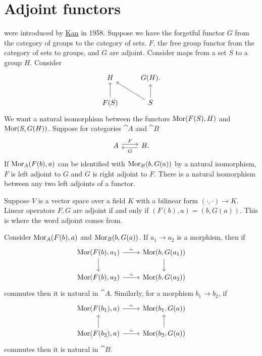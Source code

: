 \documentclass[11pt, twoside]{article}
\begin{document}
\section{Adjoint functors}
\href{https://en.wikipedia.org/wiki/Adjoint_functors}{} were introduced by \href{https://en.wikipedia.org/wiki/Daniel_Kan}{\color{black}Kan} in 1958. Suppose we have the forgetful functor $G$ from the category of groups to the category of sets. $F$, the free group functor from the category of sets to groups, and $G$ are adjoint. Consider maps from a set $S$ to a group $H$. Consider
\[
\begin{tikzcd}
H & G(H). \\
F(S) \arrow[u] & S \arrow[u]\arrow[lu]
\end{tikzcd}
\]
We want a natural isomorphism between the functors $\operatorname{Mor} (F(S), H)$ and $\operatorname{Mor} (S, G(H))$. Suppose for categories $\cat A$ and $\cat B$
\[
\begin{tikzcd}
\cat A \arrow[r, shift left, "F"]& \cat B\arrow[l, shift left, "G"].
\end{tikzcd}
\]
If $\operatorname{Mor}_{\relax A}(F(b), a)$ can be identified with $\operatorname{Mor}_{\relax B}(b, G(a))$ by a natural isomorphism, $F$ is left adjoint to $G$ and $G$ is right adjoint to $F$. There is a natural isomorphism between any two left adjoints of a functor.

Suppose $V$ is a vector space over a field $K$ with a bilinear form $(\cdot,\cdot)\longrightarrow K$. Linear operators $F, G$ are adjoint if and only if $(F(b), a)=(b, G(a))$. This is where the word adjoint comes from.

Consider $\operatorname{Mor}_{\relax A}(F(b), a)$ and $\operatorname{Mor}_{\relax B}(b, G(a))$. If $a_1\longrightarrow a_2$ is a morphism, then if
\[
\begin{tikzcd}
\Mor(F(b), a_1) \arrow[r,"\sim"] \arrow[d, ] &\Mor (b, G(a_1)) \arrow[d,]\\ \Mor(F(b), a_2)\arrow[r, "\sim"] & \Mor(b, G(a_2))
\end{tikzcd}
\]
commutes then it is natural in $\cat A$. Similarly, for a morphism $b_1\longrightarrow b_2$, if
\[
\begin{tikzcd}
\Mor(F(b_1), a) \arrow[r, "\sim"] &\Mor (b_1, G(a)) \\ \Mor(F(b_2), a)\arrow[r, "\sim"] \arrow[u]& \Mor(b_2, G(a)) \arrow[u]
\end{tikzcd}
\]
commutes then it is natural in $\cat B$.
\end{document}
